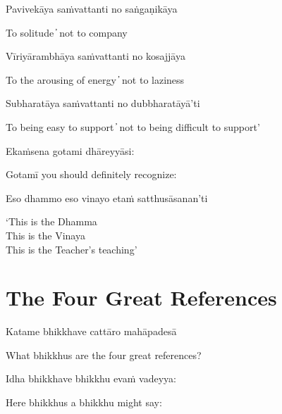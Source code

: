Pavivekāya saṁvattanti no saṅgaṇikāya

\begin{cprenglish}
To solitude  ̓  not to company
\end{cprenglish}

Vīriyārambhāya saṁvattanti no kosajjāya

\begin{cprenglish}
To the arousing of energy  ̓  not to laziness
\end{cprenglish}

Subharatāya saṁvattanti no dubbharatāyā’ti

\begin{cprenglish}
To being easy to support  ̓  not to being difficult to support’
\end{cprenglish}

Ekaṁsena gotami dhāreyyāsi:

\begin{cprenglish}
Gotamī you should definitely recognize:
\end{cprenglish}

Eso dhammo eso vinayo etaṁ satthusāsanan’ti

\begin{cprenglish}
‘This is the Dhamma\\
This is the Vinaya\\
This is the Teacher’s teaching’
\end{cprenglish}


\clearpage

\section*{The Four Great References}

\begin{leader}
\end{leader}

Katame bhikkhave cattāro mahāpadesā

\begin{cprenglish}
What bhikkhus are the four great references?
\end{cprenglish}

Idha bhikkhave bhikkhu evaṁ vadeyya:

\begin{cprenglish}
Here bhikkhus a bhikkhu might say:
\end{cprenglish}

